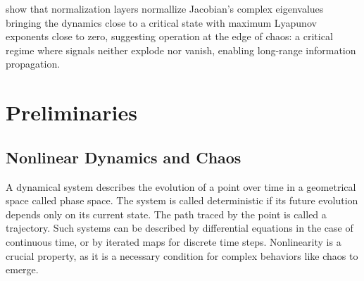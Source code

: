 \documentclass[a4paper,12pt]{article}
\begin{document}
\cite{tomihari2025recurrent_self_attention_dynamics} show that normalization layers normallize Jacobian's complex eigenvalues bringing the dynamics close to a critical state with maximum Lyapunov exponents close to zero, suggesting operation at the edge of chaos: a critical regime where signals neither explode nor vanish, enabling long-range information propagation.






\section{Preliminaries}
\label{sec:preliminaries}


\subsection{Nonlinear Dynamics and Chaos}
\label{subsec:nonlinear_dynamics}

A dynamical system describes the evolution of a point over time in a geometrical space called phase space. The system is called deterministic if its future evolution depends only on its current state. The path traced by the point is called a trajectory. Such systems can be described by differential equations in the case of continuous time, or by iterated maps for discrete time steps. Nonlinearity is a crucial property, as it is a necessary condition for complex behaviors like chaos to emerge. %
\end{document}
